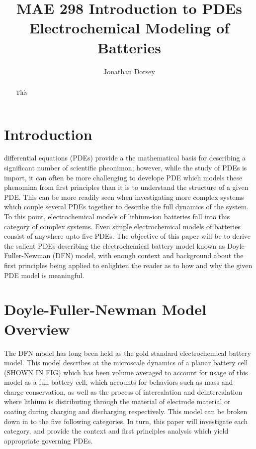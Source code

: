 \documentclass[lettersize,journal]{IEEEtran}
\begin{document}
\title{MAE 298 Introduction to PDEs \\ Electrochemical Modeling of Batteries}

\author{Jonathan Dorsey}



\maketitle

\begin{abstract}
This
\end{abstract}

\section{Introduction}
 differential equations (PDEs) provide a the mathematical basis for describing a significant number of scientific pheonimon; however, while the study of PDEs is import, it can often be more challenging to develope PDE which models these phenomina from first principles than it is to understand the structure of a given PDE. This can be more readily seen when investigating more complex systems which couple several PDEs together to describe the full dynamics of the system. To this point, electrochemical models of lithium-ion batteries fall into this category of complex systems. Even simple electrochemical models of batteries consist of anywhere upto five PDEs. The objective of this paper will be to derive the salient PDEs describing the electrochemical battery model known as Doyle-Fuller-Newman (DFN) model, with enough context and background about the first principles being applied to enlighten the reader as to how and why the given PDE model is meaningful.

\section{Doyle-Fuller-Newman Model Overview}
The DFN model has long been held as the gold standard electrochemical battery model. This model describes at the microscale dynamics of a planar battery cell (SHOWN IN FIG) which has been volume averaged to account for usage of this model as a full battery cell, which accounts for behaviors such as mass and charge conservation, as well as the process of intercalation and deintercalation where lithium is distributing through the material of electrode material or coating during charging and discharging respectively. This model can be broken down in to the five following categories. In turn, this paper will investigate each category, and provide the context and first principles analysis which yield appropriate governing PDEs.
\end{document}
